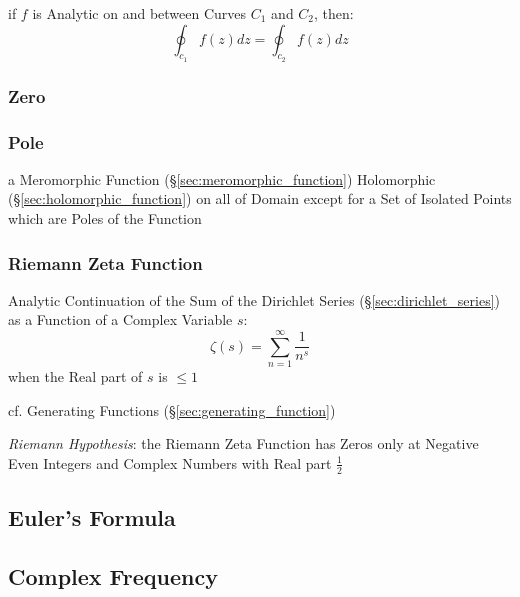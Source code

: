if $f$ is Analytic on and between Curves $C_1$ and $C_2$, then:
\[
  \oint_{c_1} f(z) dz = \oint_{c_2} f(z) dz
\]



\subsubsection{Zero}\label{sec:complex_zero}

\subsubsection{Pole}\label{sec:complex_pole}

a Meromorphic Function (\S\ref{sec:meromorphic_function}) Holomorphic
(\S\ref{sec:holomorphic_function}) on all of Domain except for a Set of
Isolated Points which are Poles of the Function



\subsubsection{Riemann Zeta Function}\label{sec:riemann_zeta}

Analytic Continuation of the Sum of the Dirichlet Series
(\S\ref{sec:dirichlet_series}) as a Function of a Complex Variable $s$:
\[
  \zeta(s) = \sum_{n=1}^\infty \frac{1}{n^s}
\]
when the Real part of $s$ is $\leq 1$

\fist cf. Generating Functions (\S\ref{sec:generating_function})

\emph{Riemann Hypothesis}: the Riemann Zeta Function has Zeros only at Negative
Even Integers and Complex Numbers with Real part $\frac{1}{2}$



\subsection{Euler's Formula}\label{sec:eulers_formula}

\subsection{Complex Frequency}\label{sec:complex_frequency}

